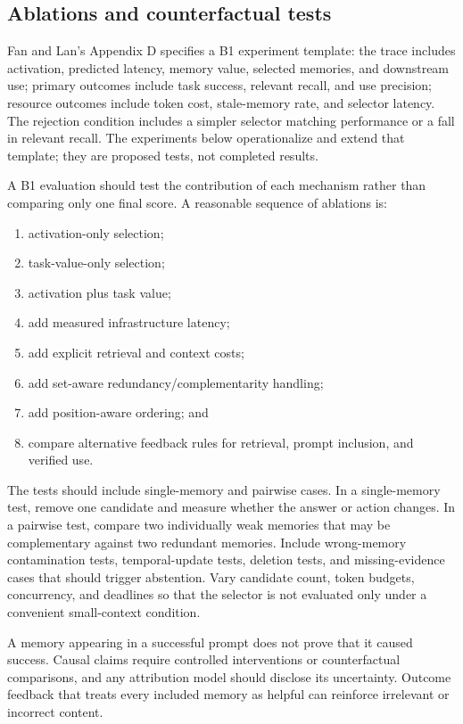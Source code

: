 \subsection{Ablations and counterfactual tests}
\label{subsec:ch12-ablations}

Fan and Lan's Appendix D specifies a B1 experiment template: the trace includes activation, predicted latency, memory value, selected memories, and downstream use; primary outcomes include task success, relevant recall, and use precision; resource outcomes include token cost, stale-memory rate, and selector latency. The rejection condition includes a simpler selector matching performance or a fall in relevant recall. The experiments below operationalize and extend that template; they are proposed tests, not completed results.

A B1 evaluation should test the contribution of each mechanism rather than comparing only one final score. A reasonable sequence of ablations is:

\begin{enumerate}
  \item activation-only selection;
  \item task-value-only selection;
  \item activation plus task value;
  \item add measured infrastructure latency;
  \item add explicit retrieval and context costs;
  \item add set-aware redundancy/complementarity handling;
  \item add position-aware ordering; and
  \item compare alternative feedback rules for retrieval, prompt inclusion, and verified use.
\end{enumerate}

The tests should include single-memory and pairwise cases. In a single-memory test, remove one candidate and measure whether the answer or action changes. In a pairwise test, compare two individually weak memories that may be complementary against two redundant memories. Include wrong-memory contamination tests, temporal-update tests, deletion tests, and missing-evidence cases that should trigger abstention. Vary candidate count, token budgets, concurrency, and deadlines so that the selector is not evaluated only under a convenient small-context condition.

\begin{warningbox}
A memory appearing in a successful prompt does not prove that it caused success. Causal claims require controlled interventions or counterfactual comparisons, and any attribution model should disclose its uncertainty. Outcome feedback that treats every included memory as helpful can reinforce irrelevant or incorrect content.
\end{warningbox}

